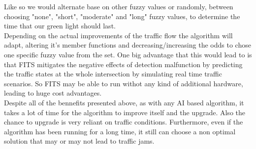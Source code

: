 \documentclass[17pt]{report}
\begin{document}
Like so we would alternate base on other fuzzy values or randomly, between
choosing "none", "short", "moderate" and "long" fuzzy values, to determine 
the time that our green light should last.\\
\indent \indent
Depending on the actual improvements of the traffic flow the algorithm will 
adapt, altering it's member functions and decreasing/increasing the odds to 
chose one specific fuzzy value from the set. One big advantage that this would 
lead to is that FITS mitigates the negative effects of detection malfunction
by predicting the traffic states at the whole intersection by simulating real
time traffic scenarios. So FITS may be able to run withot any kind of additional
hardware, leading to huge cost advantages.\\
\indent \indent
Despite all of the bennefits presented above, as with any AI based algorithm,
it takes a lot of time for the algorithm to improve itself and the upgrade.
Also the chance to upgrade is very reliant on traffic conditions. Furthermore, 
even if the algorithm has been running for a long time, it still can choose a
non optimal solution that may or may not lead to traffic jams. 

\pagebreak
\end{document}
